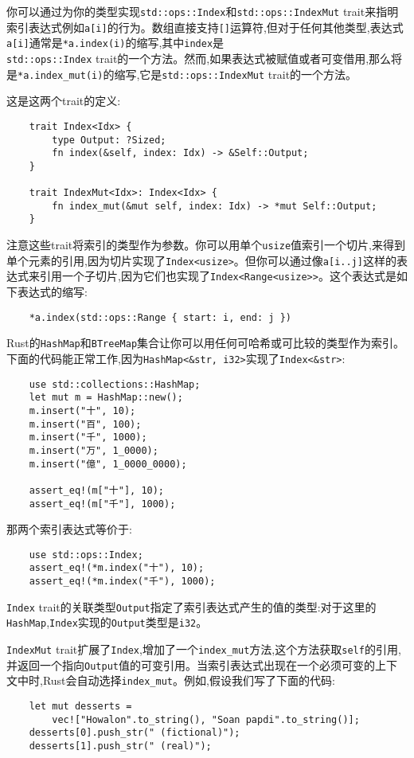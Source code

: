 你可以通过为你的类型实现\texttt{std::ops::Index}和\texttt{std::ops::IndexMut} trait来指明索引表达式例如\texttt{a[i]}的行为。数组直接支持\texttt{[]}运算符,但对于任何其他类型,表达式\texttt{a[i]}通常是\texttt{*a.index(i)}的缩写,其中\texttt{index}是\\
\texttt{std::ops::Index} trait的一个方法。然而,如果表达式被赋值或者可变借用,那么将是\texttt{*a.index\_mut(i)}的缩写,它是\texttt{std::ops::IndexMut} trait的一个方法。

这是这两个trait的定义:
\begin{verbatim}
    trait Index<Idx> {
        type Output: ?Sized;
        fn index(&self, index: Idx) -> &Self::Output;
    }

    trait IndexMut<Idx>: Index<Idx> {
        fn index_mut(&mut self, index: Idx) -> *mut Self::Output;
    }
\end{verbatim}

注意这些trait将索引的类型作为参数。你可以用单个\texttt{usize}值索引一个切片,来得到单个元素的引用,因为切片实现了\texttt{Index<usize>}。但你可以通过像\texttt{a[i..j]}这样的表达式来引用一个子切片,因为它们也实现了\texttt{Index<Range<usize>>}。这个表达式是如下表达式的缩写:
\begin{verbatim}
    *a.index(std::ops::Range { start: i, end: j })
\end{verbatim}

Rust的\texttt{HashMap}和\texttt{BTreeMap}集合让你可以用任何可哈希或可比较的类型作为索引。下面的代码能正常工作,因为\texttt{HashMap<\&str, i32>}实现了\texttt{Index<\&str>}:
\begin{verbatim}
    use std::collections::HashMap;
    let mut m = HashMap::new();
    m.insert("十", 10);
    m.insert("百", 100);
    m.insert("千", 1000);
    m.insert("万", 1_0000);
    m.insert("億", 1_0000_0000);

    assert_eq!(m["十"], 10);
    assert_eq!(m["千"], 1000);
\end{verbatim}

那两个索引表达式等价于:
\begin{verbatim}
    use std::ops::Index;
    assert_eq!(*m.index("十"), 10);
    assert_eq!(*m.index("千"), 1000);
\end{verbatim}

\texttt{Index} trait的关联类型\texttt{Output}指定了索引表达式产生的值的类型:对于这里的\texttt{HashMap},\texttt{Index}实现的\texttt{Output}类型是\texttt{i32}。

\texttt{IndexMut} trait扩展了\texttt{Index},增加了一个\texttt{index\_mut}方法,这个方法获取\texttt{self}的引用,并返回一个指向\texttt{Output}值的可变引用。当索引表达式出现在一个必须可变的上下文中时,Rust会自动选择\texttt{index\_mut}。例如,假设我们写了下面的代码:
\begin{verbatim}
    let mut desserts =
        vec!["Howalon".to_string(), "Soan papdi".to_string()];
    desserts[0].push_str(" (fictional)");
    desserts[1].push_str(" (real)");
\end{verbatim}

